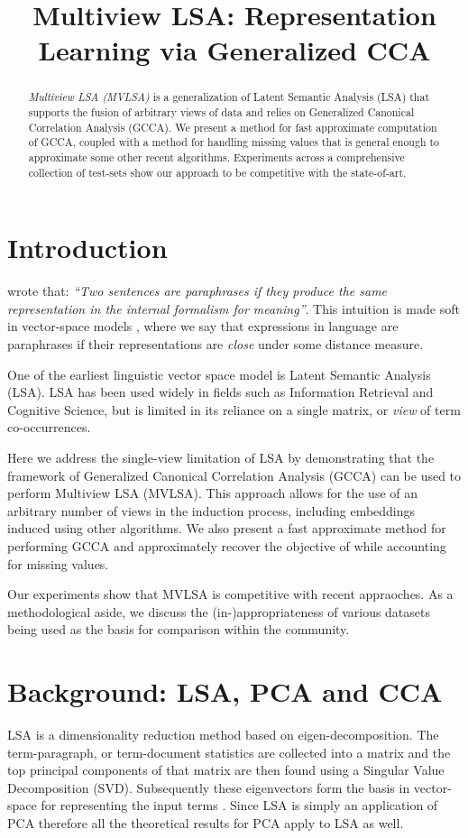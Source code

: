\documentclass[11pt]{article}
\title{Multiview LSA: Representation Learning via Generalized CCA}
\date{}
\begin{document}
\maketitle
\begin{abstract}
  \emph{Multiview LSA (MVLSA)} is a generalization of Latent Semantic Analysis (LSA) that supports the 
  fusion of arbitrary views of data and relies on Generalized Canonical Correlation
  Analysis (GCCA). We present a method
  for fast approximate computation of GCCA, coupled with a method
  for handling missing values that is general enough to approximate
  some other recent algorithms. Experiments  across a comprehensive
  collection of test-sets show our approach to be competitive with the
  state-of-art.   
\end{abstract}

\section{Introduction}
 wrote that: \emph{``Two sentences
  are paraphrases if they produce the same representation in the
  internal formalism for meaning''}.  This intuition is made soft in
vector-space models \cite{turney2010frequency}, where we say that
expressions in language are paraphrases if
their representations are \emph{close} under some distance measure.

One of the earliest linguistic vector space model is Latent
Semantic Analysis (LSA).  LSA has been used widely in fields such
as Information Retrieval and Cognitive Science, but is limited in its
reliance on a single matrix, or \emph{view} of term co-occurrences.

Here we address the single-view limitation of LSA by demonstrating
that the framework of Generalized Canonical Correlation Analysis
(GCCA) can be used to perform Multiview LSA (MVLSA). This
approach allows for the use of an arbitrary number of views in the
induction process, including embeddings
induced using other algorithms. We also present a fast approximate method
for performing GCCA and approximately recover the objective of
\cite{pennington2014glove} while accounting for missing values.

Our experiments show that MVLSA is competitive with recent appraoches.
As a methodological aside, we discuss the (in-)appropriateness of
various datasets being used as the basis for comparison within the community.

\section{Background: LSA, PCA and CCA}
LSA is a dimensionality reduction method based on
eigen-decomposition. The term-paragraph, or term-document 
statistics are collected into a matrix and the top
principal components of that matrix are then found using a Singular
Value Decomposition (SVD). Subsequently these eigenvectors form 
the basis in vector-space for representing the input terms
\cite{landauer1997solution}. Since LSA is simply an application of PCA
therefore all the theoretical results for PCA apply to LSA as well.
\end{document}
